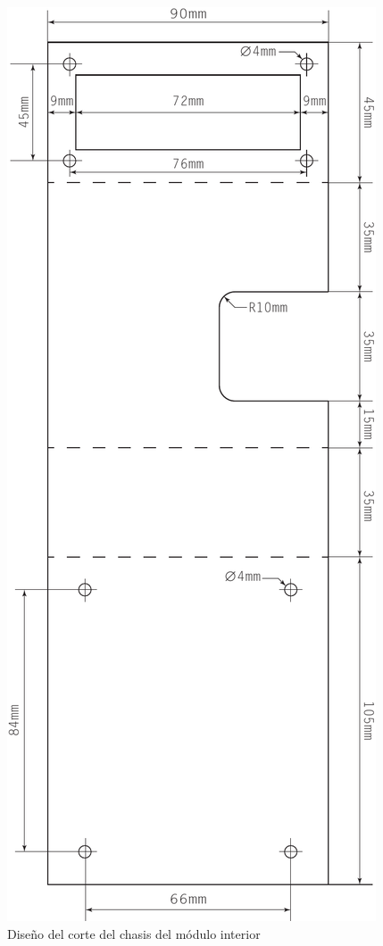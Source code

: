 \begin{figure}
  \centering
  \includegraphics[height=0.98\textheight]{../design/interior-body-blueprint}
  \caption{Diseño del corte del chasis del módulo interior}
  \label{fig:interior-body-blueprint}
\end{figure}



